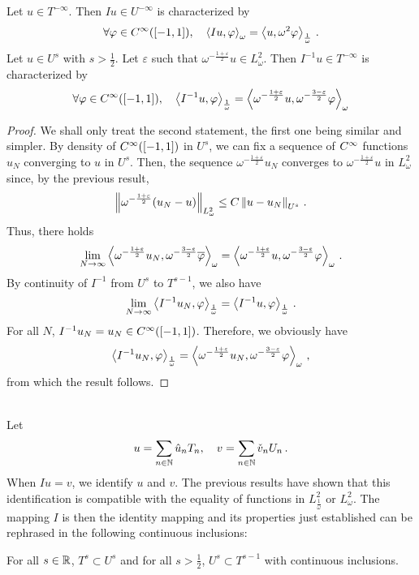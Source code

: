 \documentclass[a4paper]{article}
\begin{document}
\begin{Cor}
	Let $u \in T^{-\infty}$. Then $Iu \in U^{-\infty}$ is characterized by
	\[\forall \varphi\in C^{\infty}([-1,1]),\quad \left\langle Iu,\varphi\right\rangle_\omega = \left\langle u,\omega^2 \varphi\right\rangle_\frac{1}{\omega}\,.\]
	Let $u \in U^s$ with $s > \frac{1}{2}$. Let $\varepsilon$ such that $\omega^{-\frac{1+ \varepsilon}{2} }u \in L^2_\omega$. Then $I^{-1}u \in T^{-\infty}$ is characterized by 
	\[\forall \varphi\in C^{\infty}([-1,1]), \quad \left\langle I^{-1}u,\varphi\right\rangle_\frac{1}{\omega}=\left\langle {\omega^{-\frac{1+ \varepsilon}{2} }u},{\omega^{-\frac{3- \varepsilon}{2} } \varphi}\right\rangle_\omega \]
\end{Cor}
\begin{proof}
	We shall only treat the second statement, the first one being similar and simpler. By density of $C^{\infty}([-1,1])$ in $U^s$, we can fix a sequence of $C^{\infty}$ functions $u_N$ converging to $u$ in $U^s$. Then, the sequence $\omega^{-\frac{1 + \varepsilon}{2}}u_N$ converges to $\omega^{-\frac{1 + \varepsilon}{2}}u$ in $L^2_\omega$ since, by the previous result,
	\[\left\|\omega^{-\frac{1+ \varepsilon}{2}}(u_N - u)\right\|_{L^2_\omega} \leq C \left\|u - u_N\right\|_{U^{s}}\,.\]
	Thus, there holds 
	\[\lim_{N \to \infty} \left\langle {\omega^{-\frac{1+ \varepsilon}{2} }u_N},{\omega^{-\frac{3- \varepsilon}{2} }\overline \varphi}\right\rangle_\omega = \left\langle {\omega^{-\frac{1+ \varepsilon}{2} }u},{\omega^{-\frac{3- \varepsilon}{2} } \varphi}\right\rangle_\omega\,.\]
	By continuity of $I^{-1}$ from $U^s$ to $T^{s - 1}$, we also have 
	\[\lim_{N \to \infty}\left\langle I^{-1} u_N,\varphi\right\rangle_{\frac{1}{\omega}} = \left\langle I^{-1} u,\varphi\right\rangle_{\frac{1}{\omega}}\,. \]
	For all $N$, $I^{-1}u_N = u_N \in C^{\infty}([-1,1])$. Therefore, we obviously have
	\[\left\langle I^{-1}u_N,\varphi\right\rangle_{\frac{1}{\omega}} =  \left\langle {\omega^{-\frac{1+ \varepsilon}{2} }u_N},{\omega^{-\frac{3- \varepsilon}{2} } \varphi}\right\rangle_\omega\,,\] 
	from which the result follows.
\end{proof}
\noindent{}\\
\noindent Let
\[u = \sum_{n \in \mathbb{N} } \hat{u}_n T_n, \quad v = \sum_{n \in \mathbb{N}} \check{v}_n U_n\,.\]
When $Iu = v$, we identify $u$ and $v$. The previous results have shown that this identification is compatible with the equality of functions in $L^2_\frac{1}{\omega}$ or $L^2_\omega$. The mapping $I$ is then the identity mapping and its properties just established can be rephrased in the following continuous inclusions:
\begin{Cor}
	For all $s \in \mathbb{R}$, $T^s \subset U^s$ and for all $s > \frac{1}{2}$, $U^s \subset T^{s-1}$ with continuous inclusions.
	\label{inclusionsTsUs}
\end{Cor}
\end{document}
